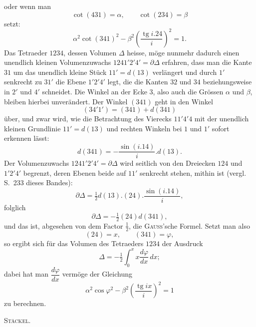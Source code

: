 %
\noindent oder wenn man
\[
\cot(431)=\alpha,\qquad\cot(234)=\beta
\]
setzt:
\[
\alpha^{2}\cot(341)^{2}-\beta^{2}\left(\frac{\operatorname{tg}i.24}{i}\right)^{2}=1.
\]
Das Tetraeder $1234$, dessen Volumen $\Delta$ heisse, möge nunmehr dadurch einen unendlich kleinen Volumenzuwachs $1241'2'4'=\partial\Delta$ erfahren, dass man die Kante $31$ um das unendlich kleine Stück $11'=d(13)$ verlängert und durch $1'$ senkrecht zu $31'$ die Ebene $1'2'4'$ legt, die die Kanten $32$ und $34$ beziehungsweise in $2'$ und $4'$ schneidet. Die Winkel an der Ecke $3$, also auch die Grössen $\alpha$ und $\beta$, bleiben hierbei unverändert. Der Winkel $(341)$ geht in den Winkel
\[
(34'1')=(341)+d(341)
\]
über, und zwar wird, wie die Betrachtung des Vierecks $11'4'4$ mit der unendlich kleinen Grundlinie $11'=d(13)$ und rechten Winkeln bei $1$ und $1'$ sofort erkennen lässt:
\[
d(341)=-\frac{\sin(i.14)}{i}.d(13).
\]
Der Volumenzuwachs $1241'2'4'=\partial\Delta$ wird seitlich von den Dreiecken $124$ und $1'2'4'$ begrenzt, deren Ebenen beide auf $11'$ senkrecht stehen, mithin ist (vergl. S.~233 dieses Bandes):
\[
\partial\Delta=\tfrac{1}{2}d(13).(24).\frac{\sin(i.14)}{i},
\]
folglich
\[
\partial\Delta=-\tfrac{1}{2}(24)d(341),
\]
und das ist, abgesehen von dem Factor $\tfrac{1}{2}$, die \textsc{Gauss}'sche Formel. Setzt man also
\[
(24)=x,\qquad(341)=\varphi,
\]
so ergibt sich für das Volumen des Tetraeders $1234$ der Ausdruck
\[
\Delta=-\tfrac{1}{2}\int_{0}^{x}x\frac{d\varphi}{dx}\,dx;
\]
dabei hat man $\dfrac{d\varphi}{dx}$ vermöge der Gleichung
\[
\alpha^{2}\cos\varphi^{2}-\beta^{2}\left(\frac{\operatorname{tg}ix}{i}\right)^{2}=1
\]
zu berechnen.
\begin{flushright}\textsc{Stäckel.}\end{flushright}
\par\endgroup
